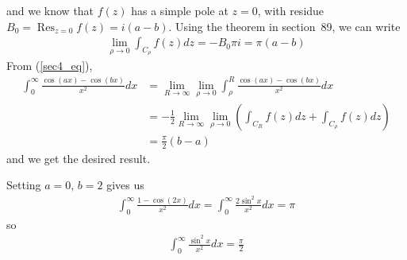 \documentclass{scrartcl}
\DeclareMathOperator*{\Res}{Res}
\begin{document}
and we know that \(f(z)\) has a simple pole at \(z = 0\), with residue \(B_0 = \Res_{z = 0} f(z) = i(a - b)\).
Using the theorem in section~89, we can write
\begin{align*}
  \lim_{\rho \to 0} \int_{C_\rho} f(z) dz = -B_0 \pi i = \pi (a - b)
\end{align*}
From (\ref{sec4_eq}),
\begin{align*}
  \int^\infty_0 \frac{\cos (ax) - \cos (bx)}{x^2} dx
  &= \lim_{R \to \infty} \lim_{\rho \to 0} \int^R_\rho \frac{\cos (ax) - \cos (bx)}{x^2} dx \\
  &= -\frac{1}{2} \lim_{R \to \infty} \lim_{\rho \to 0} \left( \int_{C_R} f(z) dz + \int_{C_\rho} f(z) dz \right) \\
  &= \frac{\pi}{2} (b - a)
\end{align*}
and we get the desired result.

Setting \(a = 0,\, b = 2\) gives us
\begin{align*}
  \int^\infty_0 \frac{1 - \cos (2x)}{x^2} dx
  = \int^\infty_0 \frac{2\sin^2 x}{x^2} dx
  = \pi
\end{align*}
so
\begin{align*}
  \int^\infty_0 \frac{\sin^2 x}{x^2} dx
  = \frac{\pi}{2}
\end{align*}
\end{document}
